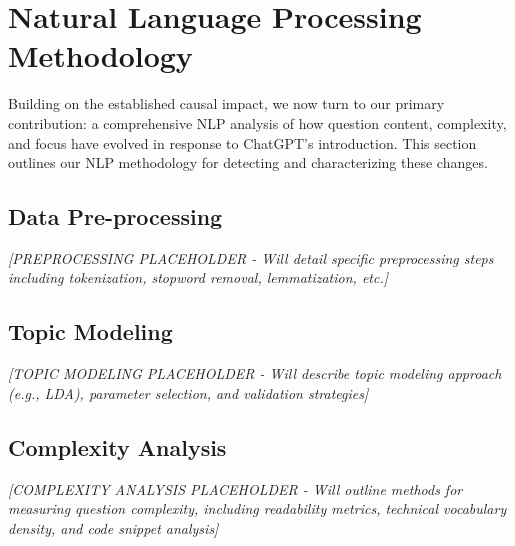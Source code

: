 \section{Natural Language Processing Methodology}
\label{sec:nlp_methodology}

Building on the established causal impact, we now turn to our primary contribution: a comprehensive NLP analysis of how question content, complexity, and focus have evolved in response to ChatGPT's introduction. This section outlines our NLP methodology for detecting and characterizing these changes.


\subsection{Data Pre-processing}
\textit{[PREPROCESSING PLACEHOLDER - Will detail specific preprocessing steps including tokenization, stopword removal, lemmatization, etc.]}


\subsection{Topic Modeling}
\textit{[TOPIC MODELING PLACEHOLDER - Will describe topic modeling approach (e.g., LDA), parameter selection, and validation strategies]}


\subsection{Complexity Analysis}
\textit{[COMPLEXITY ANALYSIS PLACEHOLDER - Will outline methods for measuring question complexity, including readability metrics, technical vocabulary density, and code snippet analysis]}

